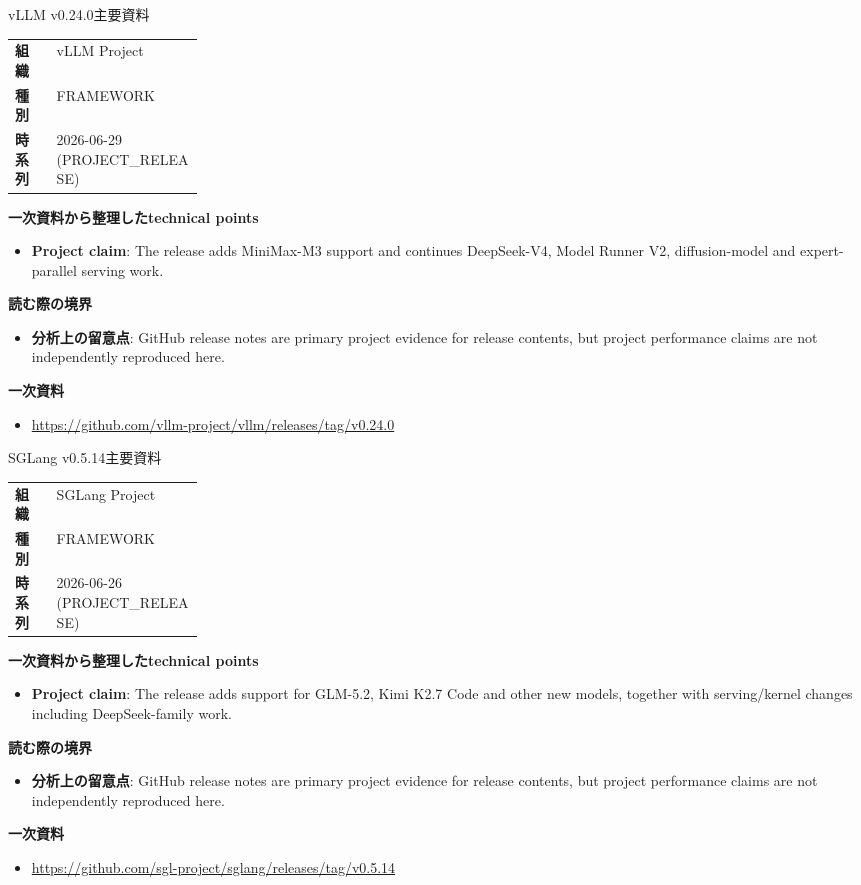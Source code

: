 \begin{technicalnote}{vLLM v0.24.0}{主要資料}
\begin{tabularx}{\linewidth}{@{}>{\bfseries}p{0.22\linewidth}X@{}}
組織 & vLLM Project \\
種別 & FRAMEWORK \\
時系列 & 2026-06-29 (PROJECT\_RELEASE) \\
\end{tabularx}
\smallskip
{\bfseries 一次資料から整理したtechnical points}
\begin{itemize}[leftmargin=1.5em,itemsep=0.35em]
\item \textbf{Project claim}: The release adds MiniMax-M3 support and continues DeepSeek-V4, Model Runner V2, diffusion-model and expert-parallel serving work.
\end{itemize}
{\bfseries 読む際の境界}
\begin{itemize}[leftmargin=1.5em,itemsep=0.35em]
\item \textbf{分析上の留意点}: GitHub release notes are primary project evidence for release contents, but project performance claims are not independently reproduced here.
\end{itemize}
{\bfseries 一次資料}
\begingroup\sloppy
\begin{itemize}[leftmargin=1.5em,itemsep=0.25em]
\item {\scriptsize\url{https://github.com/vllm-project/vllm/releases/tag/v0.24.0}}
\end{itemize}
\endgroup
\end{technicalnote}
\medskip

\begin{technicalnote}{SGLang v0.5.14}{主要資料}
\begin{tabularx}{\linewidth}{@{}>{\bfseries}p{0.22\linewidth}X@{}}
組織 & SGLang Project \\
種別 & FRAMEWORK \\
時系列 & 2026-06-26 (PROJECT\_RELEASE) \\
\end{tabularx}
\smallskip
{\bfseries 一次資料から整理したtechnical points}
\begin{itemize}[leftmargin=1.5em,itemsep=0.35em]
\item \textbf{Project claim}: The release adds support for GLM-5.2, Kimi K2.7 Code and other new models, together with serving/kernel changes including DeepSeek-family work.
\end{itemize}
{\bfseries 読む際の境界}
\begin{itemize}[leftmargin=1.5em,itemsep=0.35em]
\item \textbf{分析上の留意点}: GitHub release notes are primary project evidence for release contents, but project performance claims are not independently reproduced here.
\end{itemize}
{\bfseries 一次資料}
\begingroup\sloppy
\begin{itemize}[leftmargin=1.5em,itemsep=0.25em]
\item {\scriptsize\url{https://github.com/sgl-project/sglang/releases/tag/v0.5.14}}
\end{itemize}
\endgroup
\end{technicalnote}
\medskip

